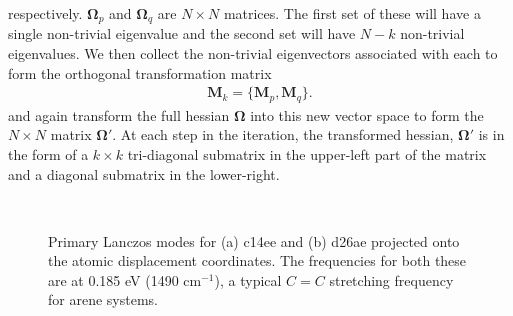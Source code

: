respectively.  $\mathbf\Omega_{p} $ and $\mathbf\Omega_{q}$ are $N\times N$ matrices.
The first set of these  will have a single
non-trivial eigenvalue and the second set
will have $N-k$ non-trivial eigenvalues. We then collect the non-trivial eigenvectors associated with each
to form the orthogonal transformation matrix
\begin{eqnarray}
{\mathbf M}_{k} = \{{\mathbf M}_{p},{\mathbf M}_{q}\}.
\end{eqnarray}
and again transform the full hessian $\mathbf\Omega$ into this new vector space to form the $N\times N$ matrix $\mathbf\Omega'$.
 At each step in the iteration, the transformed hessian, $\mathbf\Omega'$ is in the form of a
$k\times k$ tri-diagonal submatrix in the upper-left part of the matrix and
a diagonal submatrix in the lower-right.


\begin{figure}[t]
\\
\caption{
Primary Lanczos modes for (a) c14ee and (b) d26ae projected onto the atomic displacement coordinates.  The frequencies
for both these are at 0.185 eV (1490 cm$^{-1}$), a typical $C=C$ stretching frequency for arene systems.
}\label{LanczosModes}
\end{figure}


